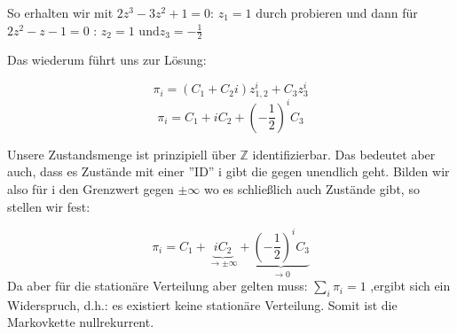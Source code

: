 \begin{uebsp}



{
So erhalten wir mit  $2z^{3}-3z^{2}+1=0$:  $z_{1}=1\text{ durch
probieren}$ und dann f\"ur  $2z^{2}-z-1=0$ :  $z_{2}=1\text{ und
}z_{3}=-{\frac{1}{2}}$ }



{
Das wiederum f\"uhrt uns zur L\"osung:}

\begin{equation*}
\pi _{i}=(C_{1}+C_{2}i)z_{1,2}^{i}+C_{3}z_{3}^{i}
\end{equation*}
\begin{equation*}
\pi _{i}=C_{1}+iC_{2}+(-{\frac{1}{2}})^{i}C_{3}
\end{equation*}


{
Unsere Zustandsmenge ist prinzipiell \"uber  $\mathbb{Z}$
identifizierbar. Das bedeutet aber auch, dass es Zust\"ande mit einer
''ID'' i gibt die gegen unendlich geht.
Bilden wir also f\"ur i den Grenzwert gegen  $\pm \infty $ wo es
schlie{\ss}lich auch Zust\"ande gibt, so stellen wir fest:}



\begin{equation*}
\pi _{i}=C_{1}+\underbrace{iC_{2}}_{\rightarrow \pm \infty
}+\underbrace{(-{\frac{1}{2}})^{i}C_{3}}_{\rightarrow 0}
\end{equation*}
{
Da aber f\"ur die station\"are Verteilung aber gelten muss:  $\sum
_{i}\pi _{i}=1$ ,ergibt sich ein Widerspruch, d.h.: es existiert keine
station\"are Verteilung. Somit ist die Markovkette nullrekurrent.}






%
\end{uebsp}
